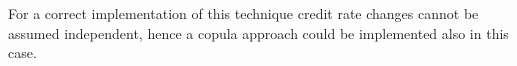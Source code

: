 For a correct implementation of this technique credit rate changes cannot be assumed independent, hence a copula approach could be implemented also in this case.
%
%		
%				

